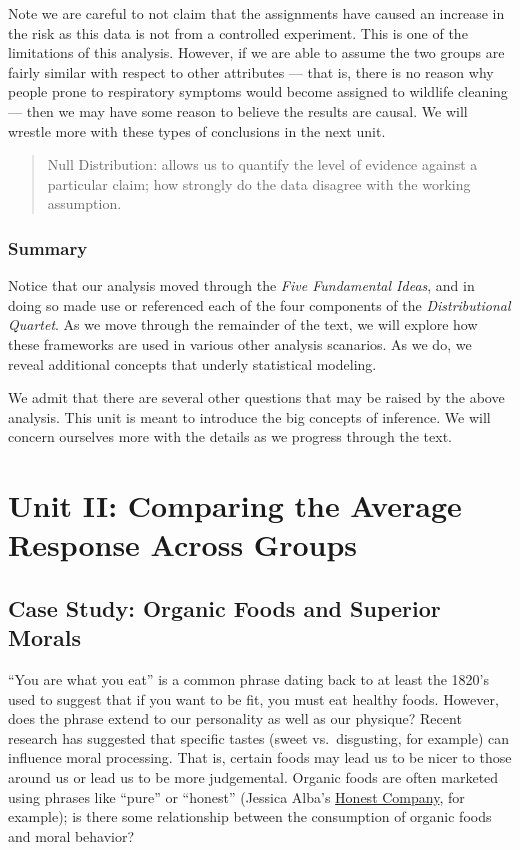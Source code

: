 \documentclass[]{book}
\theoremstyle{definition}
\theoremstyle{definition}
\theoremstyle{definition}
\theoremstyle{remark}
\begin{document}
Note we are careful to not claim that the assignments have caused an
increase in the risk as this data is not from a controlled experiment.
This is one of the limitations of this analysis. However, if we are able
to assume the two groups are fairly similar with respect to other
attributes --- that is, there is no reason why people prone to
respiratory symptoms would become assigned to wildlife cleaning --- then
we may have some reason to believe the results are causal. We will
wrestle more with these types of conclusions in the next unit.

\begin{quote}
Null Distribution: allows us to quantify the level of evidence against a
particular claim; how strongly do the data disagree with the working
assumption.
\end{quote}

\section{Summary}\label{summary}

Notice that our analysis moved through the \emph{Five Fundamental
Ideas}, and in doing so made use or referenced each of the four
components of the \emph{Distributional Quartet}. As we move through the
remainder of the text, we will explore how these frameworks are used in
various other analysis scanarios. As we do, we reveal additional
concepts that underly statistical modeling.

We admit that there are several other questions that may be raised by
the above analysis. This unit is meant to introduce the big concepts of
inference. We will concern ourselves more with the details as we
progress through the text.

\part{Unit II: Comparing the Average Response Across
Groups}\label{part-unit-ii-comparing-the-average-response-across-groups}

\hypertarget{CaseOrganic}{\chapter{Case Study: Organic Foods and
Superior Morals}\label{CaseOrganic}}

``You are what you eat'' is a common phrase dating back to at least the
1820's used to suggest that if you want to be fit, you must eat healthy
foods. However, does the phrase extend to our personality as well as our
physique? Recent research has suggested that specific tastes (sweet
vs.~disgusting, for example) can influence moral processing. That is,
certain foods may lead us to be nicer to those around us or lead us to
be more judgemental. Organic foods are often marketed using phrases like
``pure'' or ``honest'' (Jessica Alba's
\href{https://www.honest.com/}{Honest Company}, for example); is there
some relationship between the consumption of organic foods and moral
behavior?
\end{document}

